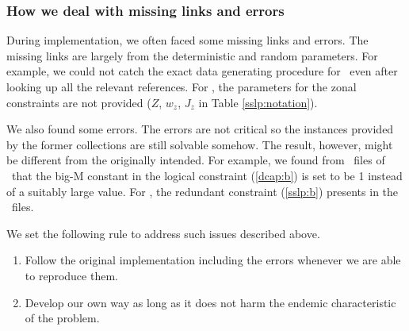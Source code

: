 \subsubsection{How we deal with missing links and errors}
During implementation, we often faced some missing links and errors. The missing links are largely from the deterministic and random parameters. For example, we could not catch the exact data generating procedure for \mptsps\ even after looking up all the relevant references. For \sslp, the parameters for the zonal constraints are not provided ($Z$, $w_z$, $J_z$ in Table \ref{sslp:notation}). 

We also found some errors. The errors are not critical so the instances provided by the former collections are still solvable somehow. The result, however, might be different from the originally intended. For example, we found from \smps\ files of \dcap\ that the big-M constant in the logical constraint (\ref{dcap:b}) is set to be 1 instead of a suitably large value. For \sslp, the redundant constraint (\ref{sslp:b}) presents in the \smps\ files. 

We set the following rule to address such issues described above.
\begin{enumerate}
	\item Follow the original implementation including the errors whenever we are able to reproduce them.
	\item Develop our own way as long as it does not harm the endemic characteristic of the problem.
\end{enumerate}

